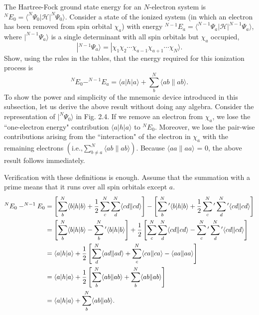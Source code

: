 \documentclass[a4paper]{book}
\newcommand\lr[2]{\langle#1\|#2\rangle}
\begin{document}
	\begin{exercise}
	The Hartree-Fock ground state energy for an $N$-electron system is $^N E_0 = \langle ^N \Psi_0 | \mathscr{H} | ^N \Psi_0 \rangle$. Consider a state of the ionized system (in which an electron has been removed from spin orbital $\chi_a$) with energy $^{N-1} E_a = \langle ^{N-1} \Psi_a | \mathscr{H} | ^{N-1} \Psi_a \rangle$, where $| ^{N-1} \Psi_a \rangle$ is a single determinant with all spin orbitals but $\chi_a$ occupied,
	\[
		| ^{N-1} \Psi_a \rangle = | \chi_1 \chi_2 \cdots \chi_{a-1} \chi_{a+1} \cdots \chi_N \rangle.
	\]
	Show, using the rules in the tables, that the energy required for this ionization process is
	\[
		^N E_0 - ^{N-1} E_a = \langle a | h | a \rangle + \sum_b^N \lr{ab}{ab}.
	\]
	To show the power and simplicity of the mnemonic device introduced in this subsection, let us derive the above result without doing any algebra. Consider the representation of $|^N \Psi_0 \rangle$ in Fig. 2.4. If we remove an electron from $\chi_a$, we lose the ``one-electron energy" contribution $\langle a | h | a \rangle$ to $^N E_0$. Moreover, we lose the pair-wise contributions arising from the ``interaction" of the electron in $\chi_a$ with the remaining electrons $\displaystyle \left( \text{i.e.,} \sum_{b \neq a}^N \lr{ab}{ab} \right)$. Because $\lr{aa}{aa}$ = 0, the above result follows immediately.
	\end{exercise}
	
	\begin{solution}
	Verification with these definitions is enough. Assume that the summation with a prime means that it runs over all spin orbitals except $a$.
	\begin{align}
		^N E_0 - ^{N-1} E_0 &= \left[ \sum^N_b \langle b | h | b \rangle + \frac{1}{2} \sum^N_c \sum^N_d \lr{cd}{cd} \right] - \left[ \sum^N_b {}^\prime \langle b | h | b \rangle + \frac{1}{2} \sum^N_c {}^\prime \sum^N_d {}^\prime \lr{cd}{cd} \right] \notag \\
		&= \left[ \sum^N_b \langle b | h | b \rangle - \sum^N_b {}^\prime \langle b | h | b \rangle \right] + \frac{1}{2} \left[  \sum^N_c \sum^N_d \lr{cd}{cd} - \sum^N_c {}^\prime \sum^N_d {}^\prime \lr{cd}{cd} \right] \notag \\
		&= \langle a | h | a \rangle + \frac{1}{2} \left[ \sum^N_d \lr{ad}{ad} + \sum^N_c \lr{ca}{ca} - \lr{aa}{aa} \right] \notag \\
		&= \langle a | h | a \rangle + \frac{1}{2} \left[ \sum^N_b \lr{ab}{ab} + \sum^N_b \lr{ab}{ab} \right] \notag \\
		&= \langle a | h | a \rangle + \sum^N_b \lr{ab}{ab}.
	\end{align}
	\end{solution}
	
\end{document}
